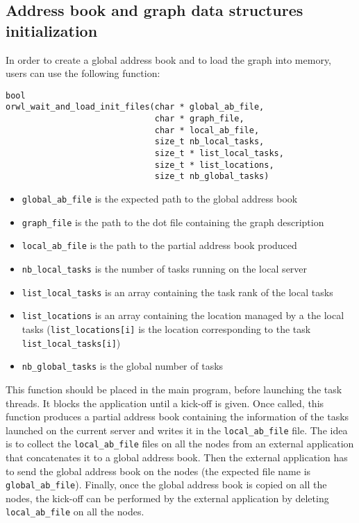\documentclass[10pt]{article}
\begin{document}
\subsection{Address book and graph data structures initialization}
In order to create a global address book and to load the graph into
memory, users can use the following function:
\begin{verbatim}
bool
orwl_wait_and_load_init_files(char * global_ab_file,
                              char * graph_file,
                              char * local_ab_file,
                              size_t nb_local_tasks,
                              size_t * list_local_tasks,
                              size_t * list_locations,
                              size_t nb_global_tasks)
\end{verbatim}
\begin{itemize}
\item \texttt{global\_ab\_file} is the expected path to the global
  address book
\item \texttt{graph\_file} is the path to the dot file containing the
  graph description
\item \texttt{local\_ab\_file} is the path to the partial address book
  produced
\item \texttt{nb\_local\_tasks} is the number of tasks running on the
  local server
\item \texttt{list\_local\_tasks} is an array containing the task rank
  of the local tasks
\item \texttt{list\_locations} is an array containing the location
  managed by a the local tasks (\texttt{list\_locations[i]} is the
  location corresponding to the task \texttt{list\_local\_tasks[i]})
\item \texttt{nb\_global\_tasks} is the global number of tasks
\end{itemize}

This function should be placed in the main program, before launching
the task threads. It blocks the application until a kick-off is
given. Once called, this function produces a partial address book
containing the information of the tasks launched on the current server
and writes it in the \texttt{local\_ab\_file} file. The idea is to
collect the \texttt{local\_ab\_file} files on all the nodes from an
external application that concatenates it to a global address
book. Then the external application has to send the global address
book on the nodes (the expected file name is
\texttt{global\_ab\_file}). Finally, once the global address book is
copied on all the nodes, the kick-off can be performed by the external
application by deleting \texttt{local\_ab\_file} on all the nodes.
\end{document}
